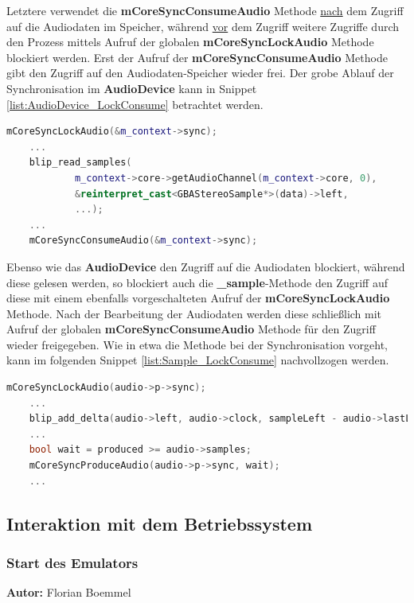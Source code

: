 \documentclass[11pt,a4paper]{scrartcl}
\newcommand{\AutorFlorian} {
    \vspace{-4mm}
    \large \textbf{Autor:} Florian Boemmel \normalsize
    \vspace{2mm}
}
\begin{document}
Letztere verwendet die \textbf{mCoreSyncConsumeAudio} Methode \underline{nach} dem Zugriff auf die Audiodaten im Speicher, w\"ahrend \underline{vor} dem Zugriff weitere Zugriffe durch den Prozess mittels Aufruf der globalen \textbf{mCoreSyncLockAudio} Methode blockiert werden. Erst der Aufruf der \textbf{mCoreSyncConsumeAudio} Methode gibt den Zugriff auf den Audiodaten-Speicher wieder frei. Der grobe Ablauf der Synchronisation im \textbf{AudioDevice} kann in Snippet \ref{list:AudioDevice_LockConsume} betrachtet werden.

\vspace{5mm}
\begin{lstlisting}[language=C++, caption={AudioDevice - \enquote{Lock / Consume}}, label={list:AudioDevice_LockConsume}]
	mCoreSyncLockAudio(&m_context->sync);
	...
	blip_read_samples(
            m_context->core->getAudioChannel(m_context->core, 0),
            &reinterpret_cast<GBAStereoSample*>(data)->left,
            ...);
    ...
    mCoreSyncConsumeAudio(&m_context->sync);
\end{lstlisting}

Ebenso wie das \textbf{AudioDevice} den Zugriff auf die Audiodaten blockiert, w\"ahrend diese gelesen werden, so blockiert auch die \textbf{{\_}sample}-Methode den Zugriff auf diese mit einem ebenfalls vorgeschalteten Aufruf der \textbf{mCoreSyncLockAudio} Methode. Nach der Bearbeitung der Audiodaten werden diese schlie{\ss}lich mit Aufruf der globalen \textbf{mCoreSyncConsumeAudio} Methode f\"ur den Zugriff wieder freigegeben. Wie in etwa die Methode bei der Synchronisation vorgeht, kann im folgenden Snippet \ref{list:Sample_LockConsume} nachvollzogen werden.

\vspace{5mm}
\begin{lstlisting}[language=C++, caption={{\_}sample - \enquote{Lock / Consume}}, label={list:Sample_LockConsume}]
	mCoreSyncLockAudio(audio->p->sync);
    ...
    blip_add_delta(audio->left, audio->clock, sampleLeft - audio->lastLeft);
    ...	
	bool wait = produced >= audio->samples;
	mCoreSyncProduceAudio(audio->p->sync, wait);
	...
\end{lstlisting}


\newpage
\subsection{Interaktion mit dem Betriebssystem}

\subsubsection{Start des Emulators}
\AutorFlorian
\end{document}
